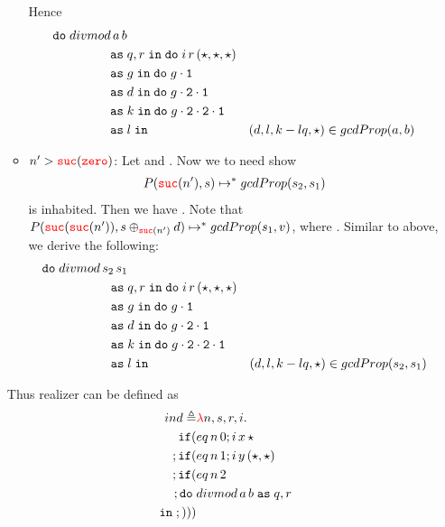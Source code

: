 \begin{enumerate}
\begin{itemize}
            Hence 
            \begin{align*}
              \isComp{
                \bind{divmod\,a\,b\\}{&q,r}{
                \bind{i\, r\, (\triv,\triv,\triv)\\}{&g}{
              \bind{\fst{g}\\}{&d}{
                \bind{\fst{\snd{g}}\\}{&k}{
                  \bind{\fst{\snd{\snd{g}}}\\}{&l}{
                    &(d,l,k-lq,\triv)}}
              }}}}{gcdProp(a,b)}
            \end{align*}
          \item $n' > {\color{red}{\mathtt{suc}}}({\color{red}{\mathtt{zero}}})$:
            Let  and .
            Now we to need show 
            \begin{align*}
              P({\color{red}{\mathtt{suc}}}(n'),s) \mapsto^* gcdProp(s_2,s_1)
            \end{align*}
            is inhabited. Then we have 
            . 
            Note that $P({\color{red}{\mathtt{suc}}}({\color{red}{\mathtt{suc}}}(n')), s \oplus_{{\color{red}{\mathtt{suc}}}(n')} d) \mapsto^* 
            gcdProp(s_1,v)$, where .
            Similar to above, we derive the following:
            \begin{align*}
              \isComp{
                \bind{divmod\,s_2\,s_1\\}{&q,r}{
                \bind{i\, r\, (\triv,\triv,\triv)\\}{&g}{
              \bind{\fst{g}\\}{&d}{
                \bind{\fst{\snd{g}}\\}{&k}{
                  \bind{\fst{\snd{\snd{g}}}\\}{&l}{
                    &(d,l,k-lq,\triv)}}
              }}}}{gcdProp(s_2,s_1)}
            \end{align*}
        \end{itemize}
        Thus realizer can be defined as 
        \begin{align*}
          ind \triangleq &{\color{red}{\lambda}} n,s,r,i .\; \\
            \mathtt{if}(&eq\,n\,0;i\,x\,\star\\;
              \mathtt{if}(&eq\,n\,1;i\,y\,(\star,\star)\\;
                \mathtt{if}(&eq\,n\,2\\;
                  \mathtt{do}\; &divmod\,a\,b \; \mathtt{as}\; q,r\\\; \mathtt{in}\;
;)))
\end{align*}
\end{enumerate}
